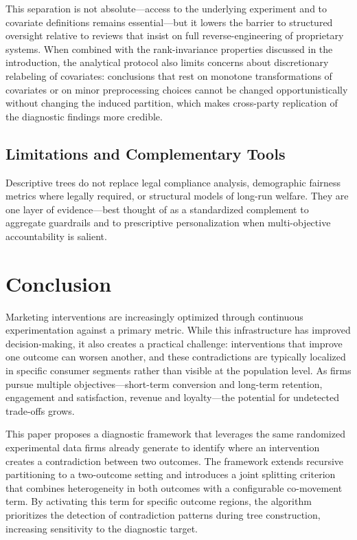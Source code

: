 \documentclass[11pt,letterpaper,english]{article}
\theoremstyle{definition}
\theoremstyle{definition}
\begin{document}
\begin{bibunit}
This separation is not absolute---access to the underlying experiment and to covariate definitions remains essential---but it lowers the barrier to structured oversight relative to reviews that insist on full reverse-engineering of proprietary systems. When combined with the rank-invariance properties discussed in the introduction, the analytical protocol also limits concerns about discretionary relabeling of covariates: conclusions that rest on monotone transformations of covariates or on minor preprocessing choices cannot be changed opportunistically without changing the induced partition, which makes cross-party replication of the diagnostic findings more credible.

\subsection{Limitations and Complementary Tools}

Descriptive trees do not replace legal compliance analysis, demographic fairness metrics where legally required, or structural models of long-run welfare. They are one layer of evidence---best thought of as a standardized complement to aggregate guardrails and to prescriptive personalization when multi-objective accountability is salient.


\section{Conclusion}
\label{sec:conclusion}

Marketing interventions are increasingly optimized through continuous experimentation against a primary metric. While this infrastructure has improved decision-making, it also creates a practical challenge: interventions that improve one outcome can worsen another, and these contradictions are typically localized in specific consumer segments rather than visible at the population level. As firms pursue multiple objectives---short-term conversion and long-term retention, engagement and satisfaction, revenue and loyalty---the potential for undetected trade-offs grows.

This paper proposes a diagnostic framework that leverages the same randomized experimental data firms already generate to identify where an intervention creates a contradiction between two outcomes. The framework extends recursive partitioning to a two-outcome setting and introduces a joint splitting criterion that combines heterogeneity in both outcomes with a configurable co-movement term. By activating this term for specific outcome regions, the algorithm prioritizes the detection of contradiction patterns during tree construction, increasing sensitivity to the diagnostic target.


\end{bibunit}
\end{document}

